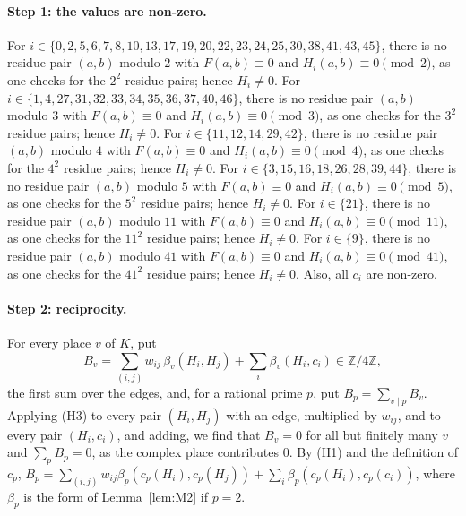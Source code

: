 \documentclass[11pt]{article}
\newcommand{\Z}{\mathbb{Z}}
\begin{document}
\paragraph{Step 1: the values are non-zero.} For $i\in\{0,\allowbreak 2,\allowbreak 5,\allowbreak 6,\allowbreak 7,\allowbreak 8,\allowbreak 10,\allowbreak 13,\allowbreak 17,\allowbreak 19,\allowbreak 20,\allowbreak 22,\allowbreak 23,\allowbreak 24,\allowbreak 25,\allowbreak 30,\allowbreak 38,\allowbreak 41,\allowbreak 43,\allowbreak 45\}$, there is no residue pair $(a,b)$ modulo $2$ with $F(a,b)\equiv0$ and $H_i(a,b)\equiv0\pmod{2}$, as one checks for the $2^2$ residue pairs; hence $H_i\neq0$. For $i\in\{1,\allowbreak 4,\allowbreak 27,\allowbreak 31,\allowbreak 32,\allowbreak 33,\allowbreak 34,\allowbreak 35,\allowbreak 36,\allowbreak 37,\allowbreak 40,\allowbreak 46\}$, there is no residue pair $(a,b)$ modulo $3$ with $F(a,b)\equiv0$ and $H_i(a,b)\equiv0\pmod{3}$, as one checks for the $3^2$ residue pairs; hence $H_i\neq0$. For $i\in\{11,\allowbreak 12,\allowbreak 14,\allowbreak 29,\allowbreak 42\}$, there is no residue pair $(a,b)$ modulo $4$ with $F(a,b)\equiv0$ and $H_i(a,b)\equiv0\pmod{4}$, as one checks for the $4^2$ residue pairs; hence $H_i\neq0$. For $i\in\{3,\allowbreak 15,\allowbreak 16,\allowbreak 18,\allowbreak 26,\allowbreak 28,\allowbreak 39,\allowbreak 44\}$, there is no residue pair $(a,b)$ modulo $5$ with $F(a,b)\equiv0$ and $H_i(a,b)\equiv0\pmod{5}$, as one checks for the $5^2$ residue pairs; hence $H_i\neq0$. For $i\in\{21\}$, there is no residue pair $(a,b)$ modulo $11$ with $F(a,b)\equiv0$ and $H_i(a,b)\equiv0\pmod{11}$, as one checks for the $11^2$ residue pairs; hence $H_i\neq0$. For $i\in\{9\}$, there is no residue pair $(a,b)$ modulo $41$ with $F(a,b)\equiv0$ and $H_i(a,b)\equiv0\pmod{41}$, as one checks for the $41^2$ residue pairs; hence $H_i\neq0$. Also, all $c_i$ are non-zero.

\paragraph{Step 2: reciprocity.} For every place $v$ of $K$, put
\begin{equation}\label{eq:B}
B_v=\sum_{(i,j)}w_{ij}\,\beta_v(H_i,H_j)+\sum_i\beta_v(H_i,c_i)\in\Z/4\Z,
\end{equation}
the first sum over the edges, and, for a rational prime $p$, put $B_p=\sum_{v\mid p}B_v$. Applying (H3) to every pair $(H_i,H_j)$ with an edge, multiplied by $w_{ij}$, and to every pair $(H_i,c_i)$, and adding, we find that $B_v=0$ for all but finitely many $v$ and $\sum_pB_p=0$, as the complex place contributes $0$. By (H1) and the definition of $c_p$, $B_p=\sum_{(i,j)}w_{ij}\beta_p(c_p(H_i),c_p(H_j))+\sum_i\beta_p(c_p(H_i),c_p(c_i))$, where $\beta_p$ is the form of Lemma~\ref{lem:M2} if $p=2$.
\end{document}
